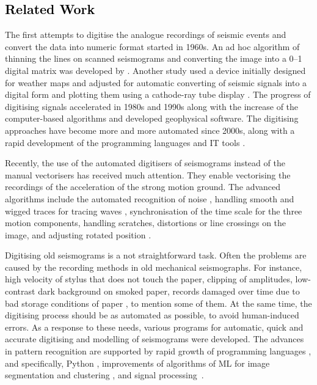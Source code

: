 \documentclass[sensors,article,accept,moreauthors,pdftex]{Definitions/mdpi}
\begin{document}
\subsection{\textcolor{black}{Related Work}}
The first attempts to digitise the analogue recordings of seismic events {and convert the data }into numeric format started in 1960s. An ad hoc %
algorithm of thinning the lines on scanned seismograms and converting the image into a 0--1 digital matrix was developed by \cite{Jarosch1975}. Another study used a device initially {designed }for weather maps and adjusted for automatic converting of seismic signals into a digital form{ }and plotting them using a cathode-ray tube display \cite{AdamsAllen1961}. The progress of digitising signals accelerated in \linebreak 1980s \citep{AspinallLatchman,CrouseMatuschka1983} and 1990s \citep{Scherbaum1996a,NorlundGriffiths1993,McGee1995,Harjesetal1993,Scherbaum1996b,Scherbaum1996c} along with the increase of {the }computer-based algorithms and {developed }geophysical software. The digitising approaches have become more and more automated since 2000s, along with a rapid development of the programming languages and IT  tools \cite{Bietal2016,Ishiietal2015,Schenke,Wangetal2014}. 
 
Recently, the use of the automated digitisers of seismograms{ }instead of {the }manual vectorisers has received much attention. {They enable vectorising the recordings of the acceleration of the strong motion ground. The advanced algorithms include the }automated recognition of noise \cite{CrouseMatuschka1983}, handling smooth and wigged traces{ }for tracing waves{ }\cite{Bietal2016}, synchronisation of the time scale for the three motion components, handling scratches, distortions or line crossings on the image, {and }adjusting rotated position \cite{Trifunacetal1999}. 

Digitising old seismograms is a not straightforward task. Often the problems are caused by the recording methods in old mechanical seismographs. For instance, high velocity of stylus that does not touch the paper, clipping of amplitudes, low-contrast dark background on smoked paper, records damaged over time due to bad storage conditions of paper \cite{Baskoutasetal2000}, to mention {some of them}. At the same time, the digitising process should be as automated as possible, to avoid human-induced errors. As a response to {these needs, various programs for }automatic, quick and accurate digitising and modelling of{ seismograms }were developed. The advances{ }in pattern recognition are supported by rapid growth of  programming languages \cite{Esmaili,analytica2030006,Lemenkova201991,Lemenkova2019100,Lemenkov202103}, and specifically, Python \cite{Cox,Stoneback, Lemenkova201989}, improvements of algorithms of  {ML}{ }for image segmentation and clustering \cite{Jenkins,signals1010005,DebeirDecaestecker,signals2030037,Debeir2008}, and signal processing~\cite{Foucart,Debeiretal2019}. 
\end{document}
